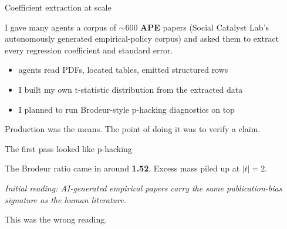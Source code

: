 \documentclass[aspectratio=169,11pt]{beamer}
\begin{document}
\begin{frame}{Coefficient extraction at scale}

I gave many agents a corpus of $\sim$600 \textbf{APE} papers (Social Catalyst Lab's autonomously generated empirical-policy corpus) and asked them to extract every regression coefficient and standard error.

\vspace{0.3cm}

\begin{itemize}\setlength\itemsep{0.25em}
    \item agents read PDFs, located tables, emitted structured rows
    \item I built my own t-statistic distribution from the extracted data
    \item I planned to run Brodeur-style p-hacking diagnostics on top
\end{itemize}

\vspace{0.3cm}

\alert{Production was the means. The point of doing it was to verify a claim.}

\end{frame}

\begin{frame}{The first pass looked like p-hacking}

The Brodeur ratio came in around \textbf{1.52}. Excess mass piled up at $|t|=2$.

\vspace{0.3cm}

\begin{center}
\textit{Initial reading: AI-generated empirical papers carry the same publication-bias signature as the human literature.}
\end{center}

\vspace{0.45cm}

\alert{This was the wrong reading.}

\end{frame}
\end{document}
